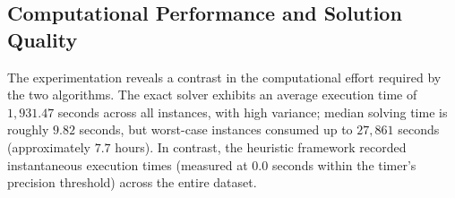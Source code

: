 \begin{table}[hbt!]
\centering
\caption{Average characteristics, solution quality, and runtime grouped by instance category.}
\label{tab:summary_results}
\end{table}

\subsection{Computational Performance and Solution Quality}

The experimentation reveals a contrast in the computational effort required by the two algorithms. The exact solver exhibits an average execution time of $1,931.47$ seconds across all instances, with high variance; median solving time is roughly $9.82$ seconds, but worst-case instances consumed up to $27,861$ seconds (approximately $7.7$ hours). In contrast, the heuristic framework recorded instantaneous execution times (measured at $0.0$ seconds within the timer's precision threshold) across the entire dataset.

